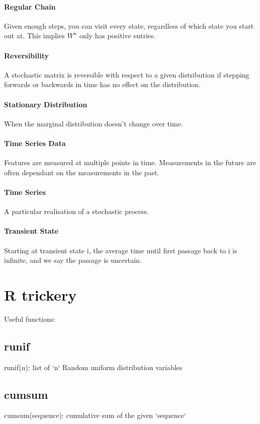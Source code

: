 \documentclass[12pt]{article}
\begin{document}
    \paragraph{Regular Chain} Given enough steps, you can visit every state, regardless of which state you start out at. This implies \(W^n\) only has positive entries.
    \paragraph{Reversibility} A stochastic matrix is reversible with respect to a given distribution if stepping forwards or backwards in time has no effect on the distribution.
    \paragraph{Stationary Distribution} When the marginal distribution doesn't change over time.
    \paragraph{Time Series Data} Features are measured at multiple points in time. Measurements in the future are often dependant on the measurements in the past.
    \paragraph{Time Series} A particular realisation of a stochastic process.
    \paragraph{Transient State} Starting at transient state i, the average time until first passage back to i is infinite, and we say the passage is uncertain.
    \section{R trickery}
    Useful functions:
    \subsection{runif}
    runif(n): list of `n` Random uniform distribution variables
    \subsection{cumsum} cumsum(sequence): cumulative sum of the given `sequence`
\end{document}
